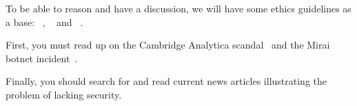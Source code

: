 To be able to reason and have a discussion, we will have some ethics guidelines 
as a base:
~\cite{acmcode},
~\cite{acmsecode} and
~\cite{ieeecode}.

First, you must read up on the Cambridge Analytica scandal~\cite[\eg][]{%
  wired-cambridge-analytica,
  guardian-cambridge-analytica,
  nytimes-cambridge-analytica,
  wp-cambridge-analytica,
} and the Mirai botnet incident~\cite{schneier-mirai}.

Finally, you should search for and read current news articles illustrating the 
problem of lacking security.
